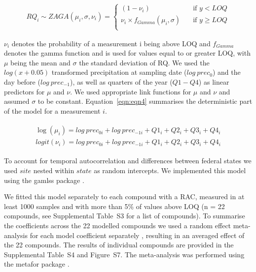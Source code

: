 \begin{align}
RQ_i \sim ZAGA(\mu_i, \sigma, \nu_i) = 
  \begin{cases}
    (1 - \nu_i)   & \quad  \text{if } y < LOQ \\
    \nu_i \times f_{Gamma} (\mu_i, \sigma) & \quad \text{if } y \ge LOQ \\
  \end{cases}
  \label{eqn:eqn3}
\end{align}

$\nu_i$ denotes the probability of a measurement i being above LOQ and $f_{Gamma}$ denotes the gamma function and is used for values equal to or greater LOQ, with $\mu$ being the mean and $\sigma$ the standard deviation of RQ.
We used the $log(x+0.05)$ transformed precipitation at sampling date ($log~prec_0$) and the day before ($log~prec_{-1}$), as well as quarters of the year ($Q1-Q4$) as linear predictors for $\mu$ and $\nu$. 
We used appropriate link functions for $\mu$ and $\nu$ and assumed $\sigma$ to be constant. 
Equation~\ref{eqn:eqn4} summarises the deterministic part of the model for a measurement $i$.

\begin{align}
\begin{split}
\log(\mu_{i}) = log~prec_{0 i} + log~prec_{-1 i} + Q1_{i} + Q2_{i}+Q3_{i}+Q4_{i}\\
logit(\nu_{i}) = log~prec_{0 i} + log~prec_{-1 i} + Q1_{i} + Q2_{i}+Q3_{i}+Q4_{i}
\end{split}
\label{eqn:eqn4}
\end{align}

To account for temporal autocorrelation and differences between federal states we used $site$ nested within $state$ as random intercepts.
We implemented this model using the gamlss package \citep{stasinopoulos_generalized_2007}. 

We fitted this model separately to each compound with a RAC, measured in at least 1000 samples and with more than 5\% of values above LOQ (n = 22 compounds, see Supplemental Table~S3 for a list of compounds). 
To summarise the coefficients across the 22 modelled compounds we used a random effect meta-analysis for each model coefficient separately \citep{harrison_getting_2011}, resulting in an averaged effect of the 22 compounds.
The results of individual compounds are provided in the Supplemental Table~S4 and Figure~S7.
The meta-analysis was performed using the metafor package \citep{Viechtbauer_2010}. 



